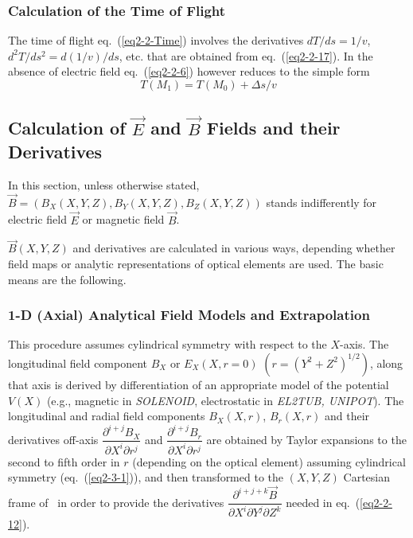 \subsubsection{Calculation of the Time of Flight \label{CalcTOF}} 

The time of flight  eq.~(\ref{eq2-2-Time}) involves the derivatives 
$dT/ds=1/v$, $d^2T/ds^2=d(1/v)/ds$, etc. that are obtained from eq.~(\ref{eq2-2-17}). In the absence of 
electric field   eq.~(\ref{eq2-2-6}) however reduces to the simple form 
%
 \begin{equation}
T(M_1) =   T(M_0) +  \Delta s/v  
 \end{equation}


\subsection{Calculation of  $ \vec E$ and $ \vec B $ Fields and their Derivatives}\label{sec2.3}    %

In this section, unless otherwise stated, $ \vec  B = (B_X(X,Y,Z),B_Y(X,Y,Z),B_Z(X,Y,Z)) $ stands 
indifferently for electric field $\vec E$  or magnetic field $\vec B$. 


\noindent $ \vec  B(X,Y,Z) $ and 
derivatives are calculated in various ways, depending  whether field maps or analytic
 representations of optical elements are  used. The  basic means are the following. 
 

\subsubsection{1-D (Axial) Analytical Field Models and Extrapolation} \label{sec2.5.2}


This procedure assumes cylindrical symmetry with respect to the $ X$-axis.
 The longitudinal field component $ B_X \textrm{~or~} E_X(X,r=0) $ $ (r=(Y^2+Z^2)^{1/2}) $,
along that axis is derived by differentiation of an appropriate 
model of the  potential $ V(X) $ (e.g., magnetic in \textsl{SOLENOID}, electrostatic in \textsl{EL2TUB, 
UNIPOT}). 
The longitudinal and radial field components $ B_X(X,r)$,  $ B_r(X,r) $ and 
their derivatives off-axis 
$  \dfrac{ \partial^{i+j}B_X }{ \partial X^i\partial r^j} $ and 
$  \dfrac{ \partial^{ i+j} B_r }{ \partial X^i\partial r^j} $  are obtained by 
Taylor expansions to the second to fifth order in $ r $ (depending on the optical element) assuming cylindrical 
symmetry (eq.~(\ref{eq2-3-1})), and then transformed to the $ (X,Y,Z) $ 
Cartesian frame of \zgou\ in order to provide the derivatives 
$ \dfrac{ \partial^{i+j+k} \vec  B }{ \partial X^i\partial Y^j\partial Z^k} $ 
needed in eq.~(\ref{eq2-2-12}).




